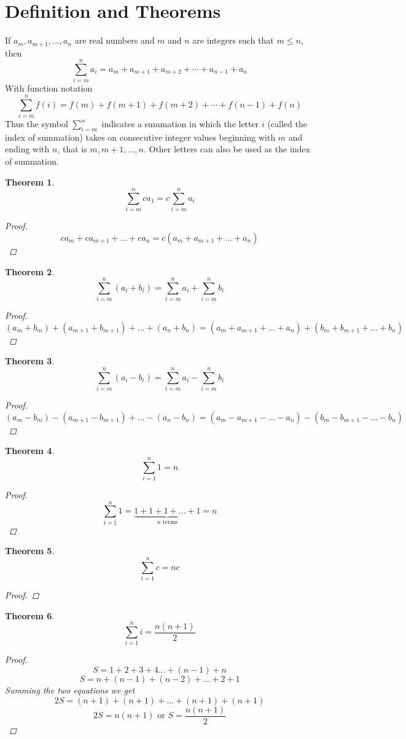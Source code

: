 \documentclass[10pt]{report}
\newtheorem{thm2}{Theorem}[section]
\begin{document}
\section{Definition and Theorems}
If $a_m, a_{m+1}, ..., a_n$ are real numbers and $m$ and $n$ are integers such that $m\leq n$, then
$$\sum_{i=m}^na_i=a_m+a_{m+1}+a_{m+2}+\cdots + a_{n-1}+a_n$$
With function notation
$$\sum_{i=m}^nf(i)=f(m)+f(m+1)+f(m+2)+\cdots + f(n-1)+f(n)$$
Thus the symbol $\sum_{i=m}^n$ indicates a summation in which the letter $i$ (called the index of summation) takes on consecutive integer values beginning with $m$ and ending with $n$, that is $m,m+1,...,n$. Other letters can also be used as the index of summation.
\begin{thm2}
$$\sum_{i=m}^n ca_1=c\sum_{i=m}^n a_i$$
\begin{proof}
$$ca_m+ca_{m+1}+ ...+ca_n=c(a_m+a_{m+1}+...+a_n)$$
\end{proof}
\end{thm2}
\begin{thm2}
$$\sum_{i=m}^n (a_i+b_i)=\sum_{i=m}^n a_i + \sum_{i=m}^n b_i$$
\begin{proof}
$$(a_m+b_m)+(a_{m+1}+b_{m+1})+...+(a_n+b_n)=(a_m+a_{m+1}+...+a_n)+(b_m+b_{m+1}+...+b_n)$$
\end{proof}
\end{thm2}
\begin{thm2}
$$\sum_{i=m}^n (a_i-b_i)=\sum_{i=m}^n a_i  - \sum_{i=m}^n b_i$$
\begin{proof}
$$(a_m-b_m)-(a_{m+1}-b_{m+1})+...-(a_n-b_n)=(a_m-a_{m+1}-...-a_n)-(b_m-b_{m+1}-...-b_n)$$
\end{proof}
\end{thm2}
\begin{thm2}
$$\sum_{i=1}^n 1=n$$
\begin{proof}
$$\sum_{i=1}^n 1= \underbrace{1+1+1+...+1}_{n \text{ terms}}=n$$
\end{proof}
\end{thm2}
\begin{thm2}
$$\sum_{i=1}^n c=nc$$
\begin{proof}

\end{proof}
\end{thm2}
\begin{thm2}
$$\sum_{i=1}^n i=\frac{n(n+1)}{2}$$
\begin{proof}
$$S= 1+ 2+3+4...+(n-1)+n$$
$$S=n+(n-1)+(n-2)+...+ 2+1$$
Summing the two equations we get
$$2S=(n+1)+(n+1)+...+(n+1)+(n+1)$$
$$2S=n(n+1)\text{  or } S=\frac{n(n+1)}{2}$$
\end{proof}
\end{thm2}
\end{document}
